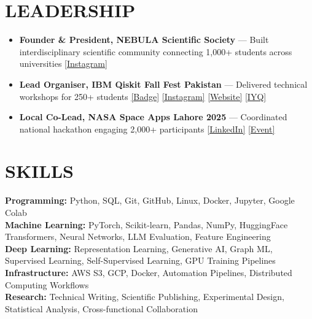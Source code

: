 \documentclass[letterpaper,8.5pt]{article}
\newcommand{\resumeItem}[1]{
  \item \small{#1}
}
\begin{document}
\section{LEADERSHIP}
\begin{itemize}
\resumeItem{\textbf{Founder \& President, NEBULA Scientific Society} — Built interdisciplinary scientific community connecting 1,000+ students across universities \href{https://www.instagram.com/nebula_headquarters?igsh=Ymc5ZXB4ZDAwa3Bx&utm_source=qr}{[Instagram]}}
\resumeItem{\textbf{Lead Organiser, IBM Qiskit Fall Fest Pakistan} — Delivered technical workshops for 250+ students \href{https://www.credly.com/badges/14eefc17-88e5-4e48-b0e8-ecb932ab0d6b/public_url}{[Badge]} \href{https://www.instagram.com/ibm_qiskit_itu/}{[Instagram]} \href{https://ibm-qiskit-fall-fest2025.vercel.app/}{[Website]} \href{https://quantum2025.org/iyq-event/ibm-qiskit-fall-fest-at-itu-pakistan/}{[IYQ]}}
\resumeItem{\textbf{Local Co-Lead, NASA Space Apps Lahore 2025} — Coordinated national hackathon engaging 2,000+ participants \href{https://www.linkedin.com/feed/update/urn:li:activity:7381065596311879680/}{[LinkedIn]} \href{https://www.spaceappschallenge.org/2025/local-events/lahore/}{[Event]}}
\end{itemize}

\section{SKILLS}
\small{
\textbf{Programming:} Python, SQL, Git, GitHub, Linux, Docker, Jupyter, Google Colab \\
\textbf{Machine Learning:} PyTorch, Scikit-learn, Pandas, NumPy, HuggingFace Transformers, Neural Networks, LLM Evaluation, Feature Engineering \\
\textbf{Deep Learning:} Representation Learning, Generative AI, Graph ML, Supervised Learning, Self-Supervised Learning, GPU Training Pipelines \\
\textbf{Infrastructure:} AWS S3, GCP, Docker, Automation Pipelines, Distributed Computing Workflows \\
\textbf{Research:} Technical Writing, Scientific Publishing, Experimental Design, Statistical Analysis, Cross-functional Collaboration
}
\end{document}
